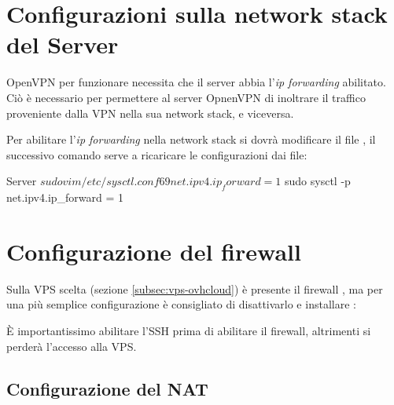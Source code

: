 \section{Configurazioni sulla network stack del Server \ok}
\label{sec:network_stack}

OpenVPN per funzionare necessita che il server abbia l'\textit{ip forwarding} abilitato. Ciò è necessario per permettere al server OpnenVPN di inoltrare il traffico proveniente dalla VPN nella sua network stack, e viceversa.

Per abilitare l'\textit{ip forwarding} nella network stack si dovrà modificare il file , il successivo comando serve a ricaricare le configurazioni dai file:

\begin{bashcode}{Server}{}
$ sudo vim /etc/sysctl.conf
69 net.ipv4.ip_forward = 1
$ sudo sysctl -p
net.ipv4.ip_forward = 1
\end{bashcode}

\section{Configurazione del firewall \ok}
\label{sec:firewall}

Sulla VPS scelta (sezione \ref{subsec:vps-ovhcloud}) è presente il firewall , ma per una più semplice configurazione è consigliato di disattivarlo e installare :


È importantissimo abilitare l'SSH prima di abilitare il firewall, altrimenti si perderà l'accesso alla VPS.

\subsection{Configurazione del NAT \ok}


